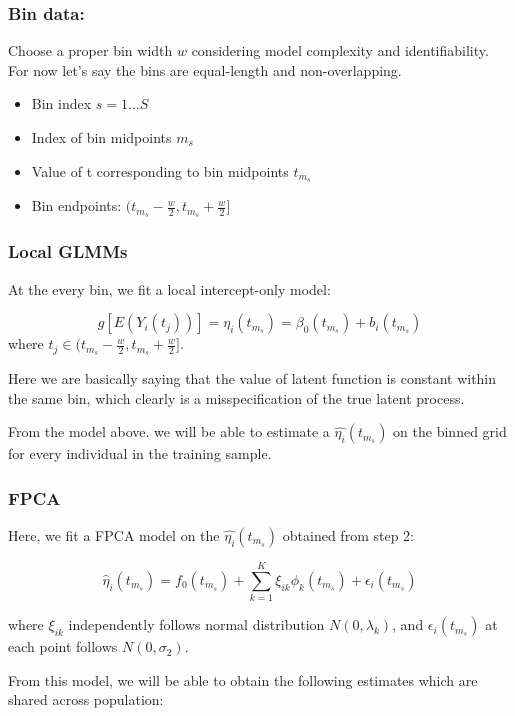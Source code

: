 \documentclass[
]{article}
\providecommand{\tightlist}{%
  \setlength{\itemsep}{0pt}\setlength{\parskip}{0pt}}
\begin{document}
\subsubsection{Bin data:}\label{bin-data}

Choose a proper bin width \(w\) considering model complexity and
identifiability. For now let's say the bins are equal-length and
non-overlapping.

\begin{itemize}
\tightlist
\item
  Bin index \(s = 1...S\)
\item
  Index of bin midpoints \(m_s\)
\item
  Value of t corresponding to bin midpoints \(t_{m_s}\)
\item
  Bin endpoints: \((t_{m_s}-\frac{w}{2}, t_{m_s}+\frac{w}{2}]\)
\end{itemize}

\subsubsection{Local GLMMs}\label{local-glmms}

At the every bin, we fit a local intercept-only model:

\[g[E(Y_i(t_j))] =\eta_i(t_{m_s})= \beta_0(t_{m_s})+b_i(t_{m_s})\] where
\(t_j \in (t_{m_s}-\frac{w}{2}, t_{m_s}+\frac{w}{2}]\).

Here we are basically saying that the value of latent function is
constant within the same bin, which clearly is a misspecification of the
true latent process.

From the model above. we will be able to estimate a
\(\hat{\eta_i}(t_{m_s})\) on the binned grid for every individual in the
training sample.

\subsubsection{FPCA}\label{fpca}

Here, we fit a FPCA model on the \(\hat{\eta_i}(t_{m_s})\) obtained from
step 2:

\[\hat{\eta}_i(t_{m_s}) = f_0(t_{m_s})+\sum_{k=1}^K\xi_{ik}\phi_{k}(t_{m_s})+\epsilon_i(t_{m_s})\]

where \(\xi_{ik}\) independently follows normal distribution
\(N(0, \lambda_k)\), and \(\epsilon_i(t_{m_s})\) at each point follows
\(N(0, \sigma_2)\).

From this model, we will be able to obtain the following estimates which
are shared across population:
\end{document}
